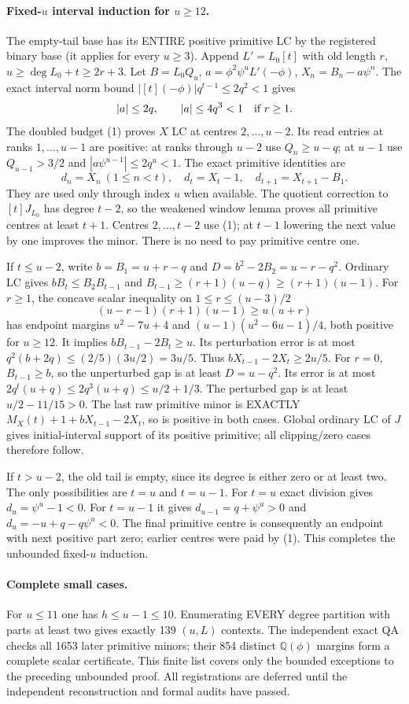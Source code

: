 \paragraph{Fixed-$u$ interval induction for $u\ge12$.}
The empty-tail base has its ENTIRE positive primitive LC by the
registered binary base (it applies for every $u\ge3$).
Append $L'=L_0[t]$ with old length $r$, $u\ge\deg L_0+t\ge2r+3$.
Let $B=L_0Q_u$, $a=\phi^2\psi^uL'(-\phi)$,
$X_n=B_n-a\psi^n$. The exact interval norm bound
$|[t](-\phi)|q^{t-1}\le2q^2<1$ gives
\[
 |a|\le2q,\qquad |a|\le4q^3<1\quad\hbox{if }r\ge1.
\]
The doubled budget (1) proves $X$ LC at centres $2,\ldots,u-2$.
Its read entries at ranks $1,\ldots,u-1$ are positive: at ranks
through $u-2$ use $Q_n\ge u-q$; at $u-1$ use
$Q_{u-1}>3/2$ and $|a\psi^{u-1}|\le2q^u<1$.
The exact primitive identities are
\[
 d_n=X_n\ (1\le n<t),\quad d_t=X_t-1,\quad
                              d_{t+1}=X_{t+1}-B_1.   \tag{2}
\]
They are used only through index $u$ when available. The quotient
correction to $[t]J_{L_0}$ has degree $t-2$, so the weakened window
lemma proves all primitive centres at least $t+1$.
Centres $2,\ldots,t-2$ use (1); at $t-1$ lowering the next value by
one improves the minor. There is no need to pay primitive centre one.

If $t\le u-2$, write $b=B_1=u+r-q$ and
$D=b^2-2B_2=u-r-q^2$. Ordinary LC gives
$bB_t\le B_2B_{t-1}$ and
$B_{t-1}\ge(r+1)(u-q)\ge(r+1)(u-1)$.
For $r\ge1$, the concave scalar inequality on $1\le r\le(u-3)/2$
\[
 (u-r-1)(r+1)(u-1)\ge u(u+r)
\]
has endpoint margins $u^2-7u+4$ and
$(u-1)(u^2-6u-1)/4$, both positive for $u\ge12$.
It implies $bB_{t-1}-2B_t\ge u$.
Its perturbation error is at most
$q^2(b+2q)\le(2/5)(3u/2)=3u/5$.
Thus $bX_{t-1}-2X_t\ge2u/5$.
For $r=0$, $B_{t-1}\ge b$, so the unperturbed gap is at least
$D=u-q^2$. Its error is at most
$2q^t(u+q)\le2q^3(u+q)\le u/2+1/3$.
The perturbed gap is at least $u/2-11/15>0$.
The last raw primitive minor is EXACTLY
$M_X(t)+1+bX_{t-1}-2X_t$, so is positive in both cases.
Global ordinary LC of $J$ gives initial-interval support of its
positive primitive; all clipping/zero cases therefore follow.

If $t>u-2$, the old tail is empty, since its degree is either zero
or at least two. The only possibilities are $t=u$ and $t=u-1$.
For $t=u$ exact division gives $d_u=\psi^u-1<0$.
For $t=u-1$ it gives $d_{u-1}=q+\psi^u>0$ and
$d_u=-u+q-q\psi^u<0$. The final primitive centre is consequently
an endpoint with next positive part zero; earlier centres were paid
by (1). This completes the unbounded fixed-$u$ induction.

\paragraph{Complete small cases.}
For $u\le11$ one has $h\le u-1\le10$. Enumerating EVERY degree
partition with parts at least two gives exactly 139 $(u,L)$ contexts.
The independent exact QA checks all 1653 later primitive minors;
their 854 distinct $\mathbb Q(\phi)$ margins form a complete scalar
certificate. This finite list covers only the bounded exceptions
to the preceding unbounded proof. All registrations are deferred
until the independent reconstruction and formal audits have passed.

